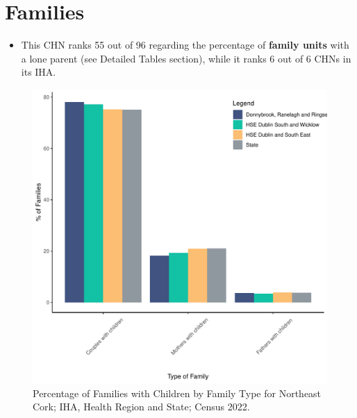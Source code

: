 \documentclass{article}
\begin{document}
\section{Families}\label{sect:Fam}
\begin{itemize}
\item This CHN ranks  55 out of 96 regarding the percentage of \textbf{family units} with a lone parent (see Detailed Tables section), while it ranks   6 out of 6 CHNs in its IHA.
\end{itemize}
\begin{figure}[H]
	\centering
	\includegraphics[width = 150mm]{../figures/FamED.pdf}
	\caption{Percentage of Families with Children by Family Type for Northeast Cork; IHA, Health Region and State; Census 2022.}
	\label{fig:vbnv}
	\end{figure}
	
\end{document}
